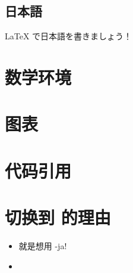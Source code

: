 \documentclass[a4paper]{scrartcl}
\begin{document}
\subsection{日本語}
\LaTeX{} で日本語を書きましょう！
\section{数学环境}\label{sec:shu_xue_huan_jing_}

\section{图表}\label{sec:tu_biao_}

\section{代码引用}\label{sec:dai_ma_yin_yong_}

\section{切换到  的理由}\label{sec:qie_huan_dao_luatex_de_li_you_}
  \begin{itemize}
    \item 就是想用 -ja!
    \item {}
  \end{itemize}
  
  
\end{document}
